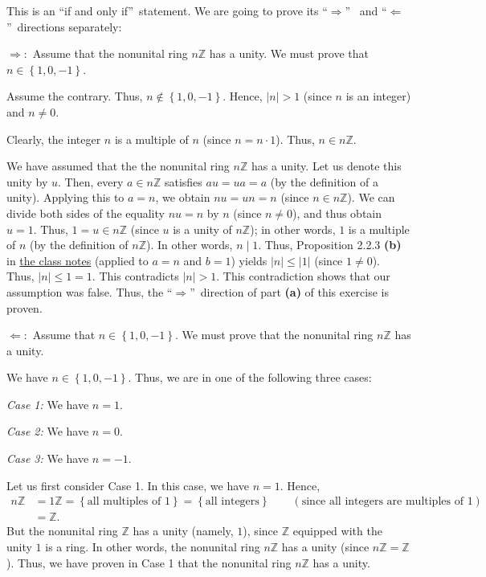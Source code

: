 \documentclass[paper=a4, fontsize=12pt]{scrartcl}%
\theoremstyle{plainsl}
\theoremstyle{definition}
\theoremstyle{remark}
\begin{document}
This is an \textquotedblleft if and only if\textquotedblright\ statement. We
are going to prove its \textquotedblleft$\Longrightarrow$\textquotedblright%
\ and \textquotedblleft$\Longleftarrow$\textquotedblright\ directions separately:

$\Longrightarrow:$ Assume that the nonunital ring $n\mathbb{Z}$ has a unity.
We must prove that $n\in\left\{  1,0,-1\right\}  $.

Assume the contrary. Thus, $n\notin\left\{  1,0,-1\right\}  $. Hence,
$\left\vert n\right\vert >1$ (since $n$ is an integer) and $n\neq0$.

Clearly, the integer $n$ is a multiple of $n$ (since $n=n\cdot1$). Thus, $n\in
n\mathbb{Z}$.

We have assumed that the the nonunital ring $n\mathbb{Z}$ has a unity. Let us
denote this unity by $u$. Then, every $a\in n\mathbb{Z}$ satisfies $au=ua=a$
(by the definition of a unity). Applying this to $a=n$, we obtain $nu=un=n$
(since $n\in n\mathbb{Z}$). We can divide both sides of the equality $nu=n$ by
$n$ (since $n\neq0$), and thus obtain $u=1$. Thus, $1=u\in n\mathbb{Z}$ (since
$u$ is a unity of $n\mathbb{Z}$); in other words, $1$ is a multiple of $n$ (by
the definition of $n\mathbb{Z}$). In other words, $n\mid1$. Thus, Proposition
2.2.3 \textbf{(b)} in
\href{http://www.cip.ifi.lmu.de/~grinberg/t/19s/notes.pdf}{the class notes}
(applied to $a=n$ and $b=1$) yields $\left\vert n\right\vert \leq\left\vert
1\right\vert $ (since $1\neq0$). Thus, $\left\vert n\right\vert \leq1=1$. This
contradicts $\left\vert n\right\vert >1$. This contradiction shows that our
assumption was false. Thus, the \textquotedblleft$\Longrightarrow
$\textquotedblright\ direction of part \textbf{(a)} of this exercise is proven.

$\Longleftarrow:$ Assume that $n\in\left\{  1,0,-1\right\}  $. We must prove
that the nonunital ring $n\mathbb{Z}$ has a unity.

We have $n\in\left\{  1,0,-1\right\}  $. Thus, we are in one of the following
three cases:

\textit{Case 1:} We have $n=1$.

\textit{Case 2:} We have $n=0$.

\textit{Case 3:} We have $n=-1$.

Let us first consider Case 1. In this case, we have $n=1$. Hence,%
\begin{align*}
n\mathbb{Z}  &  =1\mathbb{Z}=\left\{  \text{all multiples of }1\right\}
=\left\{  \text{all integers}\right\}  \qquad\left(  \text{since all integers
are multiples of }1\right) \\
&  =\mathbb{Z}.
\end{align*}
But the nonunital ring $\mathbb{Z}$ has a unity (namely, $1$), since
$\mathbb{Z}$ equipped with the unity $1$ is a ring. In other words, the
nonunital ring $n\mathbb{Z}$ has a unity (since $n\mathbb{Z}=\mathbb{Z}$).
Thus, we have proven in Case 1 that the nonunital ring $n\mathbb{Z}$ has a unity.
\end{document}
